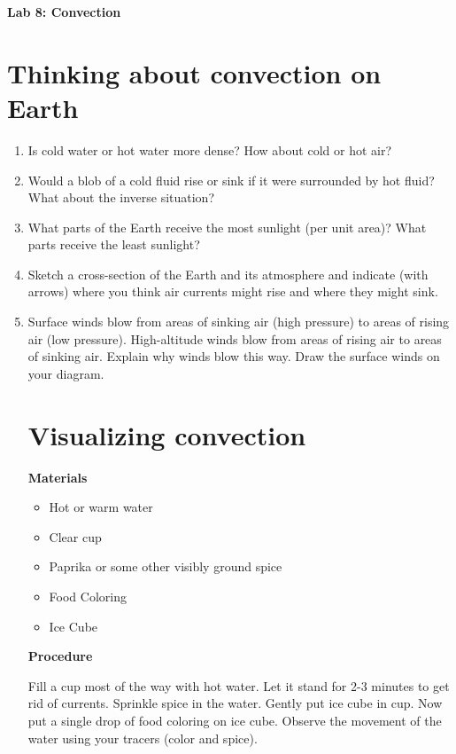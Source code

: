 \documentclass[12pt]{article}
\begin{document}
\setlength{\parskip}{8pt plus2pt minus2pt}

\begin{center}

\Large\textbf{Lab 8: Convection}
\end{center}


\section{Thinking about convection on Earth}

\begin{enumerate}
\item Is cold water or hot water more dense?  How about cold or hot air?
\item Would a blob of a cold fluid rise or sink if it were surrounded by 
hot fluid?  What about the inverse situation?
\item What parts of the Earth receive the most sunlight (per unit area)?
What parts receive the least sunlight?
\item Sketch a cross-section of the Earth and its atmosphere and indicate
(with arrows) where you think air currents might rise and where they might
sink.
\item Surface winds blow from areas of sinking air (high pressure) to 
areas of rising air (low pressure).  High-altitude winds blow from areas
of rising air to areas of sinking air.  Explain why winds blow this way.
Draw the surface winds on your diagram.


\section{Visualizing convection}


\textbf{Materials}
\begin{itemize}
\item Hot or warm water
\item Clear cup
\item Paprika or some other visibly ground spice
\item Food Coloring
\item Ice Cube
\end{itemize}

\vspace{.1in}
\textbf{Procedure}


Fill a cup most of the way with hot water.  Let it stand for 2-3 minutes to get
rid of currents.  Sprinkle spice in the water.  Gently put ice cube in cup.
Now put a single drop of food coloring on ice cube.  Observe the movement of 
the water using your tracers (color and spice).


\end{enumerate}
\end{document}
